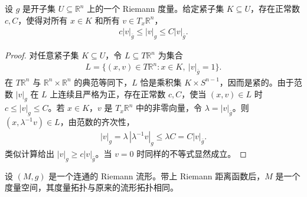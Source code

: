 \documentclass[../../main.tex]{subfiles}
\begin{document}
\begin{lemma}\label{lemma:ch13-local-comparability}
设 $g$ 是开子集 $U\subseteq\mathbb{R}^n$ 上的一个 Riemann 度量。给定紧子集 $K\subseteq U$，存在正常数 $c,C$，使得对所有 $x\in K$ 和所有 $v\in T_x\mathbb{R}^n$，
\begin{align}
c|v|_{\bar g}\leqslant |v|_g\leqslant C|v|_{\bar g}.\label{align:ch13-local-comparability}
\end{align}
\end{lemma}

\begin{proof}
对任意紧子集 $K\subseteq U$，令 $L\subseteq T\mathbb{R}^n$ 为集合
\begin{align*}
L=\{(x,v)\in T\mathbb{R}^n:x\in K,\ |v|_{\bar g}=1\}.
\end{align*}
在 $T\mathbb{R}^n$ 与 $\mathbb{R}^n\times\mathbb{R}^n$ 的典范等同下，$L$ 恰是乘积集 $K\times S^{n-1}$，因而是紧的。由于范数 $|v|_g$ 在 $L$ 上连续且严格为正，存在正常数 $c,C$，使当 $(x,v)\in L$ 时 $c\leqslant|v|_g\leqslant C$。若 $x\in K$，$v$ 是 $T_x\mathbb{R}^n$ 中的非零向量，令 $\lambda=|v|_{\bar g}$。则 $(x,\lambda^{-1}v)\in L$，由范数的齐次性，
\begin{align*}
|v|_g=\lambda\,|\lambda^{-1}v|_g\leqslant\lambda C=C|v|_{\bar g}.
\end{align*}
类似计算给出 $|v|_g\geqslant c|v|_{\bar g}$。当 $v=0$ 时同样的不等式显然成立。
\end{proof}

\begin{theorem}\label{theorem:ch13-metric-space}
设 $(M,g)$ 是一个连通的 Riemann 流形。带上 Riemann 距离函数后，$M$ 是一个度量空间，其度量拓扑与原来的流形拓扑相同。
\end{theorem}
\end{document}
